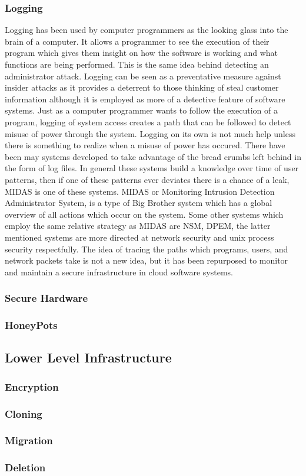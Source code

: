 \subsubsection{Logging}
\label{hlLogging}

Logging has been used by computer programmers as the looking glass into the brain of a computer. It allows a programmer to see the execution of their program which gives them insight on how the software is working and what functions are being performed. This is the same idea behind detecting an administrator attack. Logging can be seen as a preventative measure against insider attacks as it provides a deterrent to those thinking of steal customer information although it is employed as more of a detective feature of software systems. Just as a computer programmer wants to follow the execution of a program, logging of system access creates a path that can be followed to detect misuse of power through the system.
Logging on its own is not much help unless there is something to realize when a misuse of power has occured. There have been may systems developed to take advantage of the bread crumbs left behind in the form of log files. In general these systems build a knowledge over time of user patterns, then if one of these patterns ever deviates there is a chance of a leak, MIDAS is one of these systems. MIDAS or Monitoring Intrusion Detection Administrator System, is a type of Big Brother system which has a global overview of all actions which occur on the system. Some other systems which employ the same relative strategy as MIDAS are NSM, DPEM, the latter mentioned systems are more directed at network security and unix process security respectfully. The idea of tracing the paths which programs, users, and network packets take is not a new idea, but it has been repurposed to monitor and maintain a secure infrastructure in cloud software systems.

\subsubsection{Secure Hardware}
\label{hlSecureHW}

\subsubsection{HoneyPots}
\label{hlHoneyPots}

\subsection{Lower Level Infrastructure}
\label{llInfrastructure}

\subsubsection{Encryption}
\label{llEncryption}

\subsubsection{Cloning}
\label{llCloning}

\subsubsection{Migration}
\label{llMigration}

\subsubsection{Deletion}
\label{llDeletion}
